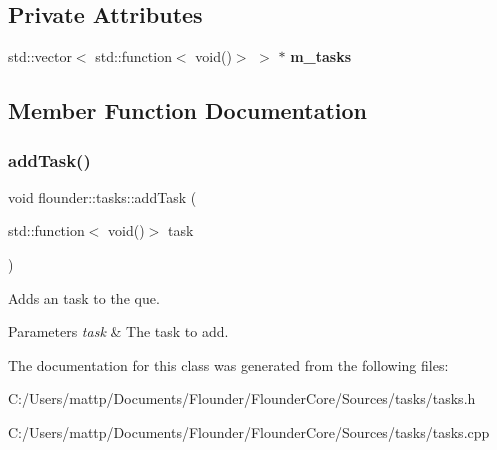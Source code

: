 \subsection*{Private Attributes}
\begin{DoxyCompactItemize}
\item 
\mbox{\label{classflounder_1_1tasks_a124cfcd550de91ef1285a41f6bb2c5ff}} 
std\+::vector$<$ std\+::function$<$ void()$>$ $>$ $\ast$ {\bfseries m\+\_\+tasks}
\end{DoxyCompactItemize}


\subsection{Member Function Documentation}
\mbox{\label{classflounder_1_1tasks_a4c162853b207b90c2686ce0eb9dc9265}} 
\subsubsection{\texorpdfstring{add\+Task()}{addTask()}}
{\footnotesize\ttfamily void flounder\+::tasks\+::add\+Task (\begin{DoxyParamCaption}\item[{std\+::function$<$ void()$>$}]{task }\end{DoxyParamCaption})}



Adds an task to the que. 


\begin{DoxyParams}{Parameters}
{\em task} & The task to add. \\
\hline
\end{DoxyParams}


The documentation for this class was generated from the following files\+:\begin{DoxyCompactItemize}
\item 
C\+:/\+Users/mattp/\+Documents/\+Flounder/\+Flounder\+Core/\+Sources/tasks/tasks.\+h\item 
C\+:/\+Users/mattp/\+Documents/\+Flounder/\+Flounder\+Core/\+Sources/tasks/tasks.\+cpp\end{DoxyCompactItemize}
